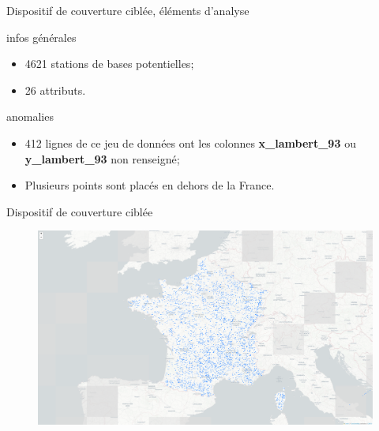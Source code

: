 \begin{frame}{Dispositif de couverture ciblée, éléments d'analyse}
    \begin{block}{infos générales}
        \begin{itemize}
            \item 4621 stations de bases potentielles;
            \item 26 attributs.
        \end{itemize}
    \end{block}

    \begin{block}{anomalies}
        \begin{itemize}
            \item 412 lignes de ce jeu de données ont les colonnes \textbf{x\_lambert\_93} ou \textbf{y\_lambert\_93} non renseigné;
            \item Plusieurs points sont placés en dehors de la France.
        \end{itemize}
    \end{block}
\end{frame}


\begin{frame}{Dispositif de couverture ciblée}
    \begin{figure}
        \includegraphics[height=.8\textheight]{images/couverture_ciblee.png}
    \end{figure}
\end{frame}

